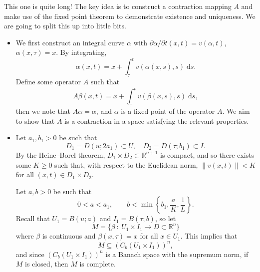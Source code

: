 \documentclass[letter-paper]{tufte-book}
\newenvironment{proof}[1][Proof]{\begin{trivlist}
\item[\hskip \labelsep {\bfseries #1}]}{\end{trivlist}}
\begin{document}
\begin{proof}
  This one is quite long! The key idea is to construct a contraction mapping $A$
  and make use of the fixed point theorem to demonstrate existence and
  uniqueness. We are going to split this up into little bits.
  
  \begin{itemize}
    \item We first construct an integral curve $\alpha$ with
    $\partial\alpha/\partial t (x, t) = v(\alpha, t)$, $\alpha(x, \tau) = x$. By
    integrating,
    \begin{equation*}
      \alpha(x, t) = x + \int_\tau^t v(\alpha(x, s), s)\; \mathrm{d}s.
    \end{equation*}
    Define some operator $A$ such that
    \begin{equation*}
      A\beta(x, t) = x + \int_\tau^t v(\beta(x, s), s)\; \mathrm{d}s,
    \end{equation*}
    then we note that $A\alpha =\alpha$, and $\alpha$ is a fixed point of the
    operator $A$. We aim to show that $A$ is a contraction in a space satisfying
    the relevant properties.
    
    \item Let $a_1, b_1 > 0$ be such that
    \begin{equation*}
      D_1 = D(u; 2a_1) \subset U, \quad D_2 = D(\tau; b_1) \subset I.
    \end{equation*}
    By the Heine--Borel theorem, $D_1 \times D_2 \subset
    \mathbb{R}^{n+1}$ is compact, and so there exists some $K \geq 0$ such that,
    with respect to the Euclidean norm, $\|v(x, t)\| < K$ for all $(x, t) \in
    D_1 \times D_2$.
    
    Let $a, b > 0$ be such that
    \begin{equation*}
      0 < a < a_1, \qquad b < \min \left\{b_1, \frac{a}{K}, \frac{1}{L}\right\}.
    \end{equation*}
    Recall that $U_1 = B(u; a)$ and $I_1 = B(\tau; b)$, so let
    \begin{equation*}
      M = \{\beta\ :\ U_1 \times I_1 \to D \subset \mathbb{R}^n \}
    \end{equation*}
    where $\beta$ is continuous and $\beta(x, \tau) = x$ for all $x\in U_1$.
    This implies that
    \begin{equation*}
      M \subseteq \left( C_b(U_1 \times I_1) \right)^n,
    \end{equation*}
    and since $\left( C_b(U_1 \times I_1) \right)^n$ is a Banach space with the
    supremum norm, if $M$ is closed, then $M$ is complete.
    

\end{itemize}
\end{proof}
\end{document}

